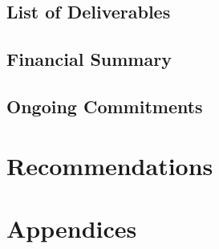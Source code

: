 \documentclass[twocolumn, aps, pra, 12pt, floatfix, showpacs]{revtex4-1}
\begin{document}
\subsection{\label{sec:projectdeliverables:listofdeliverables}List of Deliverables}


\subsection{\label{sec:projectdeliverables:financialsummary}Financial Summary}


\subsection{\label{sec:projectdeliverables:ongoingcommitments}Ongoing Commitments}



\section{\label{sec:recommendations}Recommendations}


\section{\label{sec:appendices}Appendices}



\end{document}
